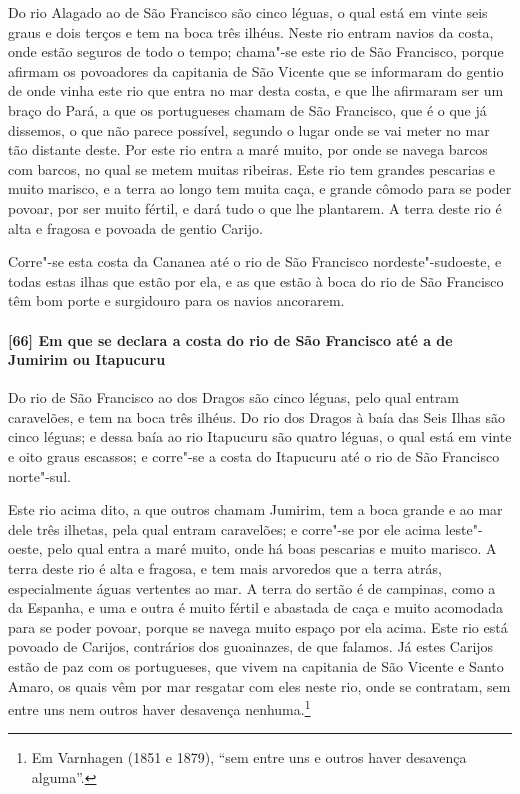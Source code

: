 \begin{linenumbers}
Do rio Alagado ao de São Francisco são cinco léguas, o qual está em vinte seis graus e
dois terços e tem na boca três ilhéus. Neste rio entram navios da costa, onde estão
seguros de todo o tempo; chama"-se este rio de São Francisco, porque afirmam os povoadores
da capitania de São Vicente que se informaram do gentio de onde vinha este rio que entra
no mar desta costa, e que lhe afirmaram ser um braço do Pará, a que os portugueses chamam
de São Francisco, que é o que já dissemos, o que não parece possível, segundo o lugar onde
se vai meter no mar tão distante deste. Por este rio entra a maré muito, por onde se
navega barcos com barcos, no qual se metem muitas ribeiras. Este rio tem grandes pescarias
e muito marisco, e a terra ao longo tem muita caça, e grande cômodo para se poder povoar,
por ser muito fértil, e dará tudo o que lhe plantarem. A terra deste rio é alta e fragosa
e povoada de gentio Carijo.

Corre"-se esta costa da Cananea até o rio de São Francisco nordeste"-sudoeste, e todas estas
ilhas que estão por ela, e as que estão à boca do rio de São Francisco têm bom porte e
surgidouro para os navios ancorarem.

\paragraph{[66] Em que se declara a costa do rio de São Francisco até a de Jumirim ou
Itapucuru} \quad
Do rio de São Francisco ao dos Dragos são cinco léguas, pelo qual entram caravelões, e tem
na boca três ilhéus. Do rio dos Dragos à baía das Seis Ilhas são cinco léguas; e dessa
baía ao rio Itapucuru são quatro léguas, o qual está em vinte e oito graus escassos; e
corre"-se a costa do Itapucuru até o rio de São Francisco norte"-sul.

Este rio acima dito, a que outros chamam Jumirim, tem a boca grande e ao mar dele três
ilhetas, pela qual entram caravelões; e corre"-se por ele acima leste"-oeste, pelo qual
entra a maré muito, onde há boas pescarias e muito marisco. A terra deste rio é alta e
fragosa, e tem mais arvoredos que a terra atrás, especialmente águas vertentes ao mar. A
terra do sertão é de campinas, como a da Espanha, e uma e outra é muito fértil e abastada
de caça e muito acomodada para se poder povoar, porque se navega muito espaço por ela
acima. Este rio está povoado de Carijos, contrários dos guoainazes, de que falamos. Já
estes Carijos estão de paz com os portugueses, que vivem na capitania de São Vicente e
Santo Amaro, os quais vêm por mar resgatar com eles neste rio, onde se contratam, sem
entre uns nem outros haver desavença nenhuma.\footnote{ Em Varnhagen (1851 e 1879), ``sem
entre uns e outros haver desavença alguma''.}


\end{linenumbers}
